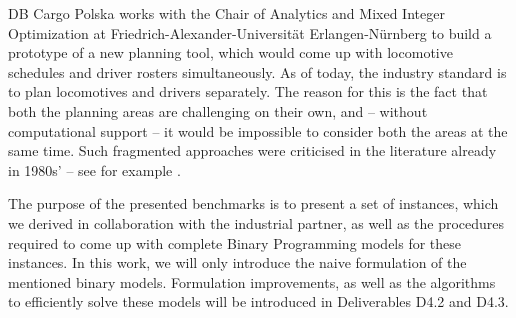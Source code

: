 DB Cargo Polska works with the Chair of Analytics and Mixed Integer Optimization at Friedrich-Alexander-Universität Erlangen-Nürnberg to build a prototype of a new planning tool, which would come up with locomotive schedules and driver rosters simultaneously. As of today, the industry standard is to plan locomotives and drivers separately. The reason for this is the fact that both the planning areas are challenging on their own, and -- without computational support -- it would be impossible to consider both the areas at the same time. Such fragmented approaches were criticised in the literature already in 1980s' -- see for example \cite{raff_routing_1983}. 

The purpose of the presented benchmarks is to present a set of instances, which we derived in collaboration with the industrial partner, as well as the procedures required to come up with complete Binary Programming models for these instances. In this work, we will only introduce the naive formulation of the mentioned binary models. Formulation improvements, as well as the algorithms to efficiently solve these models will be introduced in Deliverables D4.2 and D4.3.